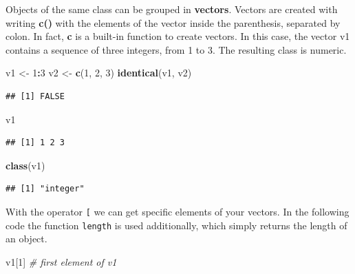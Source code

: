 \documentclass[12pt,graybox,envcountchap,sectrefs]{krantz}
\makeatletter
\newenvironment{Shaded}{\begin{snugshade}}{\end{snugshade}}
\newcommand{\KeywordTok}[1]{\textcolor[rgb]{0.13,0.29,0.53}{\textbf{#1}}}
\newcommand{\DecValTok}[1]{\textcolor[rgb]{0.00,0.00,0.81}{#1}}
\newcommand{\StringTok}[1]{\textcolor[rgb]{0.31,0.60,0.02}{#1}}
\newcommand{\CommentTok}[1]{\textcolor[rgb]{0.56,0.35,0.01}{\textit{#1}}}
\newcommand{\OperatorTok}[1]{\textcolor[rgb]{0.81,0.36,0.00}{\textbf{#1}}}
\newcommand{\NormalTok}[1]{#1}
\newenvironment{kframe}{%
\medskip{}
\setlength{\fboxsep}{.8em}
 \def\at@end@of@kframe{}%
 \ifinner\ifhmode%
  \def\at@end@of@kframe{\end{minipage}}%
  \begin{minipage}{\columnwidth}%
 \fi\fi%
 \def\FrameCommand##1{\hskip\@totalleftmargin \hskip-\fboxsep
 \colorbox{shadecolor}{##1}\hskip-\fboxsep
     \hskip-\linewidth \hskip-\@totalleftmargin \hskip\columnwidth}%
 \MakeFramed {\advance\hsize-\width
   \@totalleftmargin\z@ \linewidth\hsize
   \@setminipage}}%
 {\par\unskip\endMakeFramed%
 \at@end@of@kframe}
\renewenvironment{Shaded}{\begin{kframe}}{\end{kframe}}
\theoremstyle{definition}
\theoremstyle{definition}
\theoremstyle{definition}
\theoremstyle{remark}
\makeatother
\begin{document}
Objects of the same class can be grouped in \textbf{vectors}. Vectors
are created with writing \textbf{c()} with the elements of the vector
inside the parenthesis, separated by colon. In fact, \textbf{c} is a
built-in function to create vectors. In this case, the vector v1
contains a sequence of three integers, from 1 to 3. The resulting class
is numeric.

\begin{Shaded}
\begin{Highlighting}[]
\NormalTok{v1 <-}\StringTok{ }\DecValTok{1}\OperatorTok{:}\DecValTok{3}
\NormalTok{v2 <-}\StringTok{ }\KeywordTok{c}\NormalTok{(}\DecValTok{1}\NormalTok{, }\DecValTok{2}\NormalTok{, }\DecValTok{3}\NormalTok{)}
\KeywordTok{identical}\NormalTok{(v1, v2)}
\end{Highlighting}
\end{Shaded}

\begin{verbatim}
## [1] FALSE
\end{verbatim}

\begin{Shaded}
\begin{Highlighting}[]
\NormalTok{v1}
\end{Highlighting}
\end{Shaded}

\begin{verbatim}
## [1] 1 2 3
\end{verbatim}

\begin{Shaded}
\begin{Highlighting}[]
\KeywordTok{class}\NormalTok{(v1)}
\end{Highlighting}
\end{Shaded}

\begin{verbatim}
## [1] "integer"
\end{verbatim}

With the operator \texttt{{[}} we can get specific elements of your
vectors. In the following code the function \texttt{length} is used
additionally, which simply returns the length of an object.

\begin{Shaded}
\begin{Highlighting}[]
\NormalTok{v1[}\DecValTok{1}\NormalTok{]          }\CommentTok{# first element of v1}
\end{Highlighting}
\end{Shaded}
\end{document}
